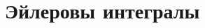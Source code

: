 \documentclass[../main.tex]{subfiles}
\begin{document}
 \chapter{Эйлеровы интегралы}
 
 
 
\end{document}
